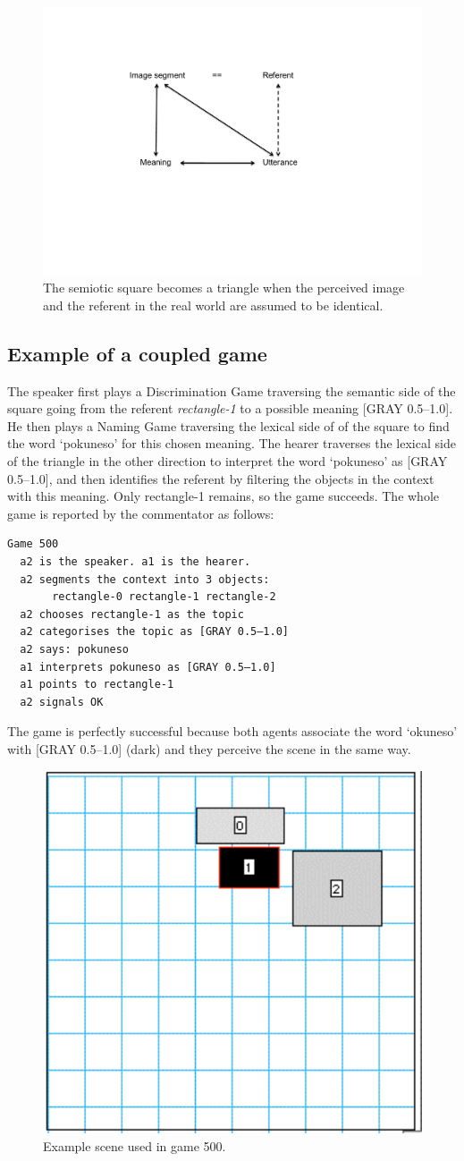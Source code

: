 \begin{figure}[htbp]
  \centerline{\includegraphics[width=.50\textwidth]{chap6/figs/square6.pdf}}
\caption{\label{square6}The semiotic square becomes
a triangle when the perceived image and the referent in the
real world are assumed to be identical.} 
\end{figure}

\subsection{Example of a coupled game}

The speaker first plays a Discrimination Game traversing the 
semantic side of the square going from the referent 
{\itshape rectangle-1} to a possible meaning [GRAY 0.5–1.0]. 
He then plays a Naming Game traversing the lexical side of 
of the square to find the word `pokuneso' for this chosen meaning. 
The hearer traverses the lexical side of the triangle in 
the other direction to interpret the word `pokuneso' as
{}[GRAY 0.5–1.0], and then identifies the referent by 
filtering the objects in the context with this meaning. 
Only rectangle-1 remains, so the game succeeds. 
The whole game is reported by the commentator as follows: 
\begin{verbatim}
Game 500
  a2 is the speaker. a1 is the hearer. 
  a2 segments the context into 3 objects: 
       rectangle-0 rectangle-1 rectangle-2
  a2 chooses rectangle-1 as the topic 
  a2 categorises the topic as [GRAY 0.5–1.0]
  a2 says: pokuneso
  a1 interprets pokuneso as [GRAY 0.5–1.0]
  a1 points to rectangle-1
  a2 signals OK 
\end{verbatim}
The game is perfectly successful because both 
agents associate the word `okuneso' with 
{}[GRAY 0.5–1.0] (dark) and they perceive the scene 
in the same way.


\begin{figure}[htbp]
  \centerline{\includegraphics[width=.40\textwidth]{chap6/figs/recscene.pdf}}
\caption{\label{rect1}Example scene used
in game 500.}
\end{figure}



